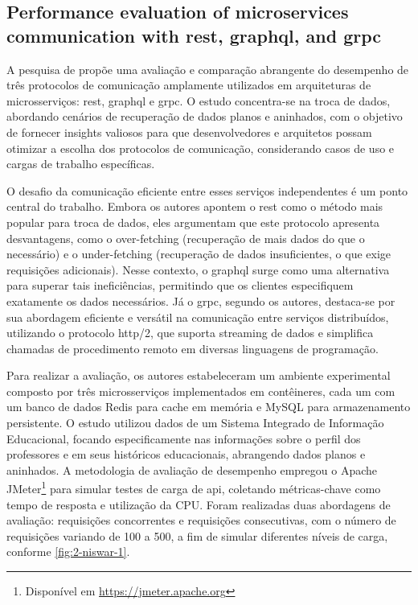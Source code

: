 \subsection{Performance evaluation of microservices communication with \acrshort{rest}, \acrshort{graphql}, and \acrshort{grpc} \cite{niswar_performance_2024}}
\label{sec:3-niswar}

A pesquisa de \textcite{niswar_performance_2024} propõe uma avaliação e comparação abrangente do desempenho de três protocolos de comunicação amplamente utilizados em arquiteturas de microsserviços: \gls{rest}, \acrshort{graphql} e \gls{grpc}. O estudo concentra-se na troca de dados, abordando cenários de recuperação de dados planos e aninhados, com o objetivo de fornecer insights valiosos para que desenvolvedores e arquitetos possam otimizar a escolha dos protocolos de comunicação, considerando casos de uso e cargas de trabalho específicas.

O desafio da comunicação eficiente entre esses serviços independentes é um ponto central do trabalho. Embora os autores apontem o \gls{rest} como o método mais popular para troca de dados, eles argumentam que este protocolo apresenta desvantagens, como o over-fetching (recuperação de mais dados do que o necessário) e o under-fetching (recuperação de dados insuficientes, o que exige requisições adicionais). Nesse contexto, o \acrshort{graphql} surge como uma alternativa para superar tais ineficiências, permitindo que os clientes especifiquem exatamente os dados necessários. Já o \gls{grpc}, segundo os autores, destaca-se por sua abordagem eficiente e versátil na comunicação entre serviços distribuídos, utilizando o protocolo \acrshort{http}/2, que suporta streaming de dados e simplifica chamadas de procedimento remoto em diversas linguagens de programação.

Para realizar a avaliação, os autores estabeleceram um ambiente experimental composto por três microsserviços implementados em contêineres, cada um com um banco de dados Redis para cache em memória e MySQL para armazenamento persistente. O estudo utilizou dados de um Sistema Integrado de Informação Educacional, focando especificamente nas informações sobre o perfil dos professores e em seus históricos educacionais, abrangendo dados planos e aninhados. A metodologia de avaliação de desempenho empregou o Apache JMeter\footnote{Disponível em \hyperref[https://jmeter.apache.org]{https://jmeter.apache.org}} para simular testes de carga de \gls{api}, coletando métricas-chave como tempo de resposta e utilização da CPU. Foram realizadas duas abordagens de avaliação: requisições concorrentes e requisições consecutivas, com o número de requisições variando de 100 a 500, a fim de simular diferentes níveis de carga, conforme \autoref{fig:2-niswar-1}.

